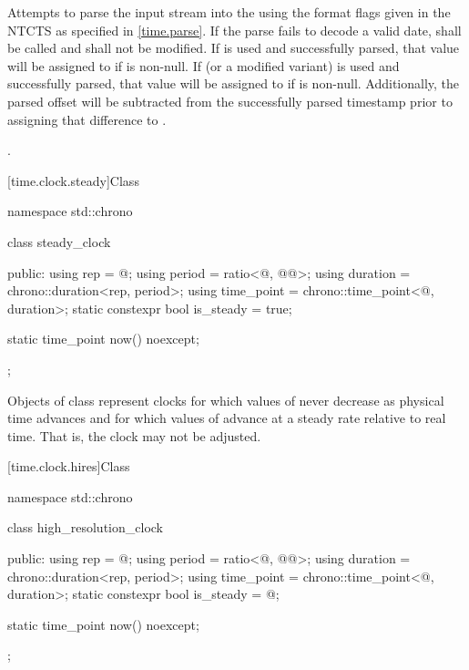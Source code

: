 \begin{itemdescr}
\pnum
\effects
Attempts to parse the input stream 
into the   using
the format flags given in the NTCTS 
as specified in \ref{time.parse}.
If the parse fails to decode a valid date,
 shall be called
and  shall not be modified.
If  is used and successfully parsed,
that value will be assigned to  if  is non-null.
If  (or a modified variant) is used and successfully parsed,
that value will be assigned to  if  is non-null.
Additionally, the parsed offset will be subtracted from
the successfully parsed timestamp prior to assigning that difference to .

\pnum
\returns
{}.
\end{itemdescr}

[time.clock.steady]{Class }
%

\begin{codeblock}
namespace std::chrono {
  class steady_clock {
  public:
    using rep        = @\unspec@;
    using period     = ratio<@\unspecnc@, @\unspec{}@>;
    using duration   = chrono::duration<rep, period>;
    using time_point = chrono::time_point<@\unspecnc@, duration>;
    static constexpr bool is_steady = true;

    static time_point now() noexcept;
  };
}
\end{codeblock}

\pnum
Objects of class  represent clocks for which values of 
never decrease as physical time advances and for which values of  advance at
a steady rate relative to real time. That is, the clock may not be adjusted.

[time.clock.hires]{Class }
%

\begin{codeblock}
namespace std::chrono {
  class high_resolution_clock {
  public:
    using rep        = @\unspec@;
    using period     = ratio<@\unspecnc@, @\unspec{}@>;
    using duration   = chrono::duration<rep, period>;
    using time_point = chrono::time_point<@\unspecnc@, duration>;
    static constexpr bool is_steady = @\unspec@;

    static time_point now() noexcept;
  };
}
\end{codeblock}

